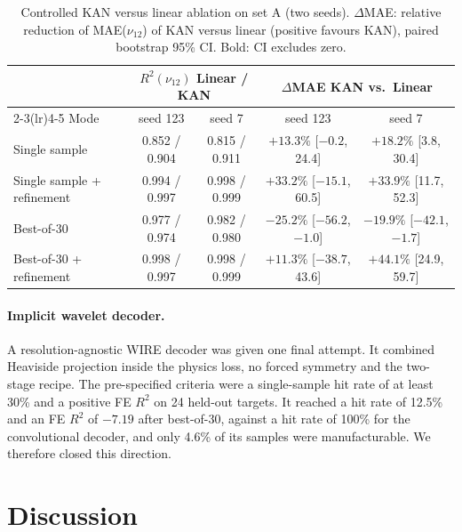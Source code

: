 \documentclass[a4paper,11pt]{article}
\newcommand{\nuot}{\nu_{12}}
\newcommand{\RR}{R^2}
\begin{document}
\begin{table}[t]
\centering
\caption{Controlled KAN versus linear ablation on set A (two seeds).
$\Delta$MAE: relative reduction of MAE($\nuot$) of KAN versus linear
(positive favours KAN), paired bootstrap 95\% CI. Bold: CI excludes zero.}
\label{tab:kan}
\small
\setlength{\tabcolsep}{4pt}
\begin{tabular}{lcccc}
\toprule
 & \multicolumn{2}{c}{$\RR(\nuot)$ Linear / KAN} & \multicolumn{2}{c}{$\Delta$MAE KAN vs.\ Linear}\\
\cmidrule(lr){2-3}\cmidrule(lr){4-5}
Mode & seed 123 & seed 7 & seed 123 & seed 7\\
\midrule
Single sample              & 0.852 / 0.904 & 0.815 / 0.911 & $+13.3\%$ [$-0.2$, 24.4] & $\mathbf{+18.2\%}$ [3.8, 30.4]\\
Single sample + refinement & 0.994 / 0.997 & 0.998 / 0.999 & $+33.2\%$ [$-15.1$, 60.5] & $\mathbf{+33.9\%}$ [11.7, 52.3]\\
Best-of-30                 & 0.977 / 0.974 & 0.982 / 0.980 & $\mathbf{-25.2\%}$ [$-56.2$, $-1.0$] & $\mathbf{-19.9\%}$ [$-42.1$, $-1.7$]\\
Best-of-30 + refinement    & 0.998 / 0.997 & 0.998 / 0.999 & $+11.3\%$ [$-38.7$, 43.6] & $\mathbf{+44.1\%}$ [24.9, 59.7]\\
\bottomrule
\end{tabular}
\end{table}

\paragraph{Implicit wavelet decoder.}
A resolution-agnostic WIRE decoder \citep{saragadam2023wire} was given one
final attempt. It combined Heaviside projection inside the physics loss, no
forced symmetry and the two-stage recipe. The pre-specified criteria were a
single-sample hit rate of at least 30\% and a positive FE $\RR$ on 24
held-out targets. It reached a hit rate of 12.5\% and an FE $\RR$ of $-7.19$
after best-of-30, against a hit rate of 100\% for the convolutional decoder,
and only 4.6\% of its samples were manufacturable. We therefore closed this
direction.

\section{Discussion}
\end{document}
